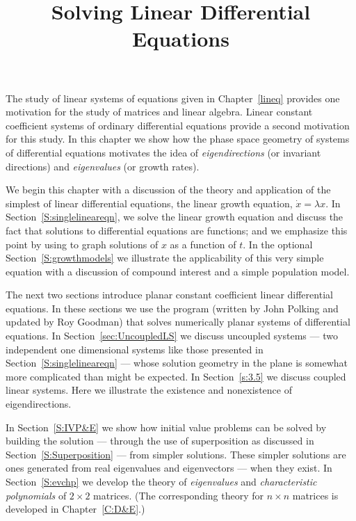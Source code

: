 \documentclass{ximera}
\title{Solving Linear Differential Equations}
\begin{document}
\begin{abstract}
\end{abstract}
\maketitle

\normalsize

The study of linear systems of equations given in Chapter~\ref{lineq}
provides one motivation for the study of matrices and linear algebra.  
Linear constant coefficient systems of ordinary differential equations 
provide a second motivation for this study.  In this chapter we
show how the phase space geometry of systems of differential equations
motivates the idea of {\em eigendirections} (or invariant directions) and
{\em eigenvalues\/} (or growth rates).  

We begin this chapter with a discussion of the theory and application
of the simplest of linear differential equations, the linear growth equation,
$\dot{x}=\lambda x$.  In Section~\ref{S:singlelineareqn}, we solve the linear
growth equation and discuss the fact that solutions to differential equations
are functions; and we emphasize this point by using \Matlab to graph
solutions of $x$ as a function of $t$.  In the optional Section~\ref{S:growthmodels} we  
illustrate the applicability of this very simple equation with a discussion of 
compound interest and a simple population model.


The next two sections introduce planar constant coefficient linear
differential equations.  In these sections we use the program {\pplane}
(written by John Polking and updated by 
Roy Goodman) that solves numerically planar systems of
differential equations.  In Section~\ref{sec:UncoupledLS} we discuss 
uncoupled systems --- two independent one dimensional systems like those 
presented in Section~\ref{S:singlelineareqn} --- whose solution geometry in the 
plane is somewhat more complicated than might be expected.  In 
Section~\ref{s:3.5} we discuss coupled linear systems.  Here we
illustrate the existence and nonexistence of eigendirections.

In Section~\ref{S:IVP&E} we show how initial value problems can be solved 
by building the solution --- through the use of superposition as discussed in 
Section~\ref{S:Superposition} --- from simpler solutions.  These simpler
solutions are ones generated from real eigenvalues and eigenvectors
--- when they exist.  In Section~\ref{S:evchp} we develop the theory of  
{\em eigenvalues\/} and {\em characteristic polynomials\/} of $2\times 2$ 
matrices.  (The corresponding theory for $n\times n$ matrices is developed in 
Chapter~\ref{C:D&E}.)
\end{document}
